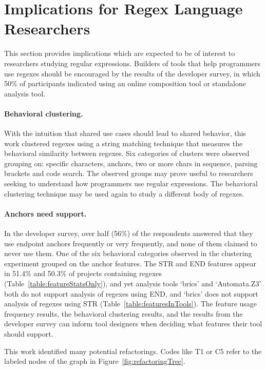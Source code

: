 \section{Implications for Regex Language Researchers}
This section provides implications which are expected to be of interest to researchers studying regular expressions.  Builders of tools that help programmers use regexes should be encouraged by the results of the developer survey, in which 50\% of participants indicated using an online composition tool or standalone analysis tool.

\paragraph{Behavioral clustering.}  With the intuition that shared use cases should lead to shared behavior, this work clustered regexes using a string matching technique that measures the behavioral similarity between regexes.  Six categories of clusters were observed grouping on: specific characters, anchors, two or more chars in sequence, parsing brackets and code search.  The observed groups may prove useful to researchers seeking to understand how programmers use regular expressions.  The behavioral clustering technique may be used again to study a different body of regexes.

\paragraph{Anchors need support.}  In the developer survey, over half (56\%) of the respondents answered that they use endpoint anchors frequently or very frequently, and none of them claimed to never use them.  One of the six behavioral categories observed in the clustering experiment grouped on the anchor features.  The STR and END features appear in 51.4\% and 50.3\% of projects containing regexes (Table~\ref{table:featureStatsOnly}), and yet analysis tools `brics' and `Automata.Z3' both do not support analysis of regexes using END, and `brics' does not support analysis of regexes using STR (Table~\ref{table:featuresInTools}).  The feature usage frequency results, the behavioral clustering results, and the results from the developer survey can inform tool designers when deciding what features their tool should support.

This work identified many potential refactorings.  Codes like T1 or C5 refer to the labeled nodes of the graph in Figure~\ref{fig:refactoringTree}.

